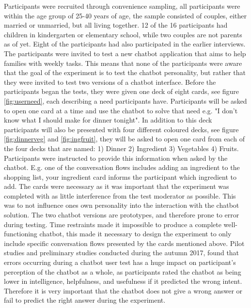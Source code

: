     Participants were recruited through convenience sampling, all participants were within the age group of 25-40 years of age, the sample consisted of couples, either married or unmarried, but all living together. 12 of the 16 participants had children in kindergarten or elementary school, while two couples are not parents as of yet. Eight of the participants had also participated in the earlier interviews. The participants were invited to test a new chatbot application that aims to help families with weekly tasks. This means that none of the participants were aware that the goal of the experiment is to test the chatbot personality, but rather that they were invited to test two versions of a chatbot interface. Before the participants began the tests, they were given one deck of eight cards, see figure \ref{fig:userneed}, each describing a need participants have. Participants will be asked to open one card at a time and use the chatbot to solve that need e.g. "I don't know what I should make for dinner tonight". In addition to this deck participants will also be presented with four different coloured decks, see figure \ref{fig:dinnerveg} and \ref{fig:ingfruit}, they will be asked to open one card from each of the four decks that are named: 1) Dinner 2) Ingredient 3) Vegetables 4) Fruits. Participants were instructed to provide this information when asked by the chatbot. E.g. one of the conversation flows includes adding an ingredient to the shopping list, your ingredient card informs the participant which ingredient to add. The cards were necessary as it was important that the experiment was completed with as little interference from the test moderator as possible. This was to not influence ones own personality into the interaction with the chatbot solution. The two chatbot versions are prototypes, and therefore prone to error during testing. Time restraints made it impossible to produce a complete well-functioning chatbot, this made it necessary to design the experiment to only include specific conversation flows presented by the cards mentioned above. Pilot studies and preliminary studies conducted during the autumn 2017, found that errors occurring during a chatbot user test has a huge impact on participant's perception of the chatbot as a whole, as participants rated the chatbot as being lower in intelligence, helpfulness, and usefulness if it predicted the wrong intent. Therefore it is very important that the chatbot does not give a wrong answer or fail to predict the right answer during the experiment. 
   
